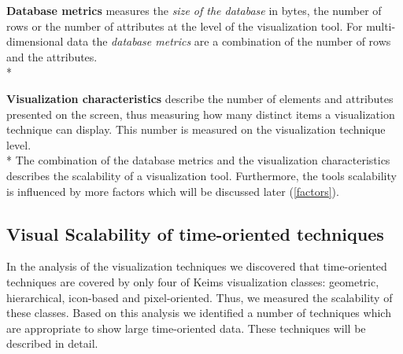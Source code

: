 \textbf{Database metrics} measures the \textit{size of the database} in bytes, the number of rows or the number of attributes at the level of the visualization tool. For multi-dimensional data the \textit{database metrics} are a combination of the number of rows and the attributes. \\*

\textbf{Visualization characteristics} describe the number of elements and attributes presented on the screen, thus measuring how many distinct items a visualization technique can display. This number is measured on the visualization technique level.
\\*
The combination of the database metrics and the visualization characteristics describes the scalability of a visualization tool. Furthermore, the tools scalability is influenced by more factors which will be discussed later (\ref{factors}).

\subsection{Visual Scalability of time-oriented techniques}\label{visualization}
In the analysis of the visualization techniques we discovered that time-oriented techniques are covered by only four of Keims visualization classes: geometric, hierarchical, icon-based and pixel-oriented. Thus, we measured the scalability of these classes. 
 Based on this analysis we identified a number of  techniques which are appropriate to show large time-oriented data. These techniques will be described in detail.

